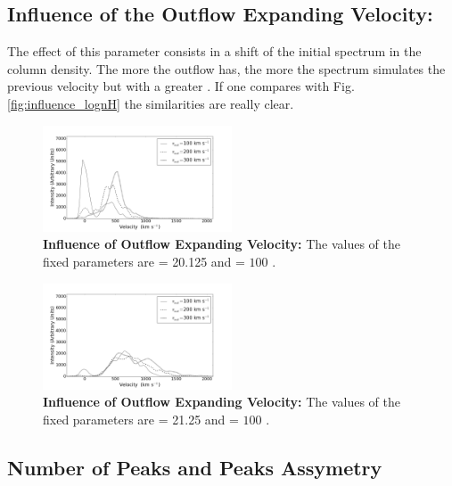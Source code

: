 \documentclass{latex/emulateapj}
\begin{document}
\subsection{Influence of the Outflow Expanding Velocity: \vout }

The effect of this parameter consists in a shift of the initial spectrum in the column density. The more \vout the outflow has, the more the spectrum simulates the previous velocity but with a greater \lognh. If one compares with Fig. \ref{fig:influence_lognH} the similarities are really clear. 

\begin{figure}[h!]
\begin{center}
  \includegraphics[width=0.5\textwidth]{./figures/inf_vout1_soft.png}
\end{center}
\caption{\textbf{Influence of Outflow Expanding Velocity:} The values of the fixed parameters are \lognh = 20.125 and \vgal = $100$ \kms.\\
\label{fig:influence_vout1}}
\end{figure}

\begin{figure}[h!]
\begin{center}
  \includegraphics[width=0.5\textwidth]{./figures/inf_vout2_soft.png}
\end{center}
\caption{\textbf{Influence of Outflow Expanding Velocity:} The values of the fixed parameters are \lognh = 21.25 and \vgal = $100$ \kms.\\
\label{fig:influence_vout2}}
\end{figure}

\subsection{Number of Peaks and Peaks Assymetry}
\end{document}
